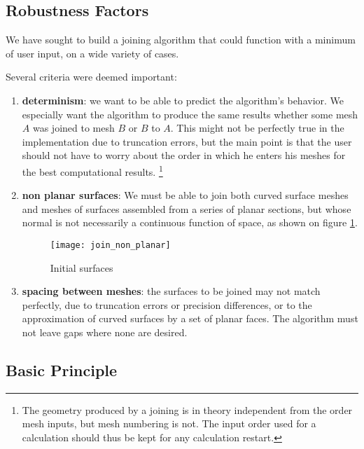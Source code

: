 \subsection*{Robustness Factors%
               \label{sec:join.robust}}

We have sought to build a joining algorithm that could function with
a minimum of user input, on a wide variety of cases.

Several criteria were deemed important:

\begin{enumerate}

\item {\bf determinism}: we want to be able to predict the algorithm's behavior.
We especially want the algorithm to produce the same results whether
some mesh $A$ was joined to mesh $B$ or $B$ to $A$. This might not be perfectly
true in the implementation due to truncation errors, but the main point is
that the user should not have to worry about the order in which he enters
his meshes for the best computational results.
\footnote{The geometry produced by a joining is in theory independent
from the order mesh inputs, but mesh numbering is not. The input order
used for a calculation should thus be kept for any calculation restart.}

\item {\bf non planar surfaces}: We must be able to join both curved surface
meshes and meshes of surfaces assembled from a series of planar sections,
but whose normal is not necessarily a continuous function of space,
as shown on figure \ref{fig:algo.join.non_planar}.

\begin{figure}[!h]
\centerline{
\texttt{[image: join\_non\_planar]}}
\caption{Initial surfaces}
\label{fig:algo.join.non_planar}
\end{figure}

\item {\bf spacing between meshes}: the surfaces to be joined may
not match perfectly, due to truncation errors or precision differences,
or to the approximation of curved surfaces by a set of planar faces.
The algorithm must not leave gaps where none are desired.

\end{enumerate}

\subsection*{Basic Principle\label{sec:join.principe}}

